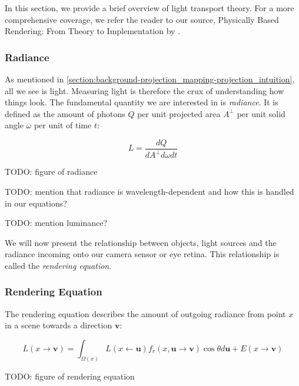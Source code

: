 In this section, we provide a brief overview of light transport theory. For a more comprehensive coverage, we refer the reader to our source, Physically Based Rendering: From Theory to Implementation by \citet{PBRT3e}.

\subsubsection{Radiance}
\label{section:background-projection_mapping-light_transport-radiance}

As mentioned in \ref{section:background-projection_mapping-projection_intuition}, all we see is light. Measuring light is therefore the crux of understanding how things look. The fundamental quantity we are interested in is \textit{radiance}. It is defined as the amount of photons \(Q\) per unit projected area \(A^\perp \) per unit solid angle \(\omega\) per unit of time \(t\):

\begin{equation}
    \label{eq:radiance}
    L = \frac{dQ}{dA^\perp d\omega dt}
\end{equation}

{\color{red} TODO: figure of radiance}

{\color{red} TODO: mention that radiance is wavelength-dependent and how this is handled in our equations?}

{\color{red} TODO: mention luminance?}

We will now present the relationship between objects, light sources and the radiance incoming onto our camera sensor or eye retina. This relationship is called the \textit{rendering equation}.

\subsubsection{Rendering Equation}
\label{section:background-projection_mapping-light_transport-rendering_equation}

The rendering equation describes the amount of outgoing radiance from point \(x\) in a scene towards a direction \(\mathbf{v}\):

\begin{equation}
    \label{eq:rendering_equation}
    L(x \rightarrow \mathbf{v}) = \int_{\Omega(x)} L(x \leftarrow \mathbf{u}) f_r(x, \mathbf{u} \rightarrow \mathbf{v}) \cos \theta d\mathbf{u} + E(x \rightarrow \mathbf{v})
\end{equation}

{\color{red} TODO: figure of rendering equation}

